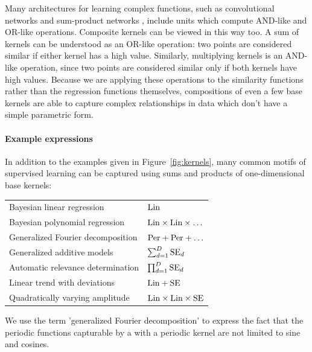 \documentclass[twoside]{article}
\begin{document}
Many architectures for learning complex functions, such as convolutional networks  and sum-product networks , include units which 
compute AND-like and OR-like operations. Composite kernels can be viewed in this way too. A sum of kernels can be understood as an OR-like operation:
two points are considered similar if either kernel has a high value. Similarly, multiplying kernels is an AND-like operation, since two points are considered
similar only if both kernels have high values. Because we are applying these operations to the similarity functions rather than the regression functions themselves,
compositions of even a few base kernels are able to capture complex relationships in data which don't have a simple parametric form.


\paragraph{Example expressions}

In addition to the examples given in Figure~\ref{fig:kernels}, many common motifs of supervised learning can be captured using sums and products of one-dimensional base kernels:

\begin{tabular}{l|l}
Bayesian linear regression & $\textrm{Lin}$ \\
Bayesian polynomial regression & $\textrm{Lin} \times \textrm{Lin} \times \ldots$\\
Generalized Fourier decomposition & $\textrm{Per} + \textrm{Per} + \ldots$ \\
Generalized additive models & $\sum_{d=1}^D \textrm{SE}_d$ \\
Automatic relevance determination & $\prod_{d=1}^D \textrm{SE}_d$ \\
Linear trend with deviations & $\textrm{Lin} + \textrm{SE}$ \\
Quadratically varying amplitude & $\textrm{Lin} \times \textrm{Lin} \times \textrm{SE}$
\end{tabular}

We use the term 'generalized Fourier decomposition' to express the fact that the periodic functions capturable by a \gp{} with a periodic kernel are not limited to sine and cosines.


\end{document}
